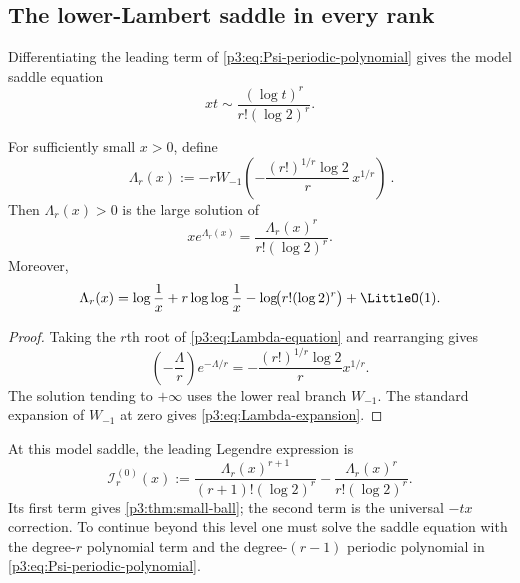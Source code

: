 \documentclass[11pt,oneside]{article}
\theoremstyle{definition}
\theoremstyle{remark}
\begin{document}
\subsection{The lower-Lambert saddle in every rank}

Differentiating the leading term of \eqref{p3:eq:Psi-periodic-polynomial} gives the model saddle equation
\begin{equation}\label{p3:eq:model-saddle}
  xt\sim\frac{(\log t)^r}{r!(\log2)^r}.
\end{equation}

\begin{proposition}\label{p3:prop:Lambert-coordinate}
For sufficiently small $x>0$, define
\begin{equation}\label{p3:eq:Lambda-r}
 \boxed{\ 
 \Lambda_r(x):=-rW_{-1}\!\left(
 -\frac{(r!)^{1/r}\log2}{r}\,x^{1/r}
 \right)
 \ }.
\end{equation}
Then $\Lambda_r(x)>0$ is the large solution of
\begin{equation}\label{p3:eq:Lambda-equation}
  xe^{\Lambda_r(x)}
  =\frac{\Lambda_r(x)^r}{r!(\log2)^r}.
\end{equation}
Moreover,
\begin{equation}\label{p3:eq:Lambda-expansion}
 \Lambda_r(x)=\log\frac1x+r\log\log\frac1x
 -\log\!\bigl(r!(\log2)^r\bigr)+\LittleO(1).
\end{equation}
\end{proposition}

\begin{proof}
Taking the $r$th root of \eqref{p3:eq:Lambda-equation} and rearranging gives
\[
 \left(-\frac{\Lambda}{r}\right)e^{-\Lambda/r}
 =-\frac{(r!)^{1/r}\log2}{r}x^{1/r}.
\]
The solution tending to $+\infty$ uses the lower real branch $W_{-1}$.  The standard expansion of $W_{-1}$ at zero \cite{p3:corless-lambert,p3:dlmf-lambert} gives \eqref{p3:eq:Lambda-expansion}.
\end{proof}

At this model saddle, the leading Legendre expression is
\begin{equation}\label{p3:eq:model-rate}
 \mathscr I_r^{(0)}(x)
 :=\frac{\Lambda_r(x)^{r+1}}{(r+1)!(\log2)^r}
 -\frac{\Lambda_r(x)^r}{r!(\log2)^r}.
\end{equation}
Its first term gives \cref{p3:thm:small-ball}; the second term is the universal $-tx$ correction.  To continue beyond this level one must solve the saddle equation with the degree-$r$ polynomial term and the degree-$(r-1)$ periodic polynomial in \eqref{p3:eq:Psi-periodic-polynomial}.
\end{document}
